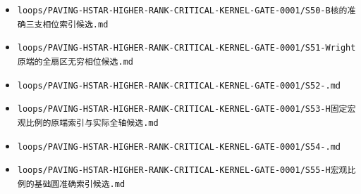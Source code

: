 \documentclass[10pt]{article}
\begin{document}
\begin{itemize}
\item \texttt{loops/\allowbreak{}PAVING-\allowbreak{}HSTAR-\allowbreak{}HIGHER-\allowbreak{}RANK-\allowbreak{}CRITICAL-\allowbreak{}KERNEL-\allowbreak{}GATE-\allowbreak{}0001/\allowbreak{}S50-B{\cjkfont 核\allowbreak{}的\allowbreak{}准\allowbreak{}确\allowbreak{}三\allowbreak{}支\allowbreak{}相\allowbreak{}位\allowbreak{}索\allowbreak{}引\allowbreak{}候\allowbreak{}选}.\allowbreak{}md}
\item \texttt{loops/\allowbreak{}PAVING-\allowbreak{}HSTAR-\allowbreak{}HIGHER-\allowbreak{}RANK-\allowbreak{}CRITICAL-\allowbreak{}KERNEL-\allowbreak{}GATE-\allowbreak{}0001/\allowbreak{}S51-\allowbreak{}Wright{\cjkfont 原\allowbreak{}端\allowbreak{}的\allowbreak{}全\allowbreak{}扇\allowbreak{}区\allowbreak{}无\allowbreak{}穷\allowbreak{}相\allowbreak{}位\allowbreak{}候\allowbreak{}选}.\allowbreak{}md}
\item \texttt{loops/\allowbreak{}PAVING-\allowbreak{}HSTAR-\allowbreak{}HIGHER-\allowbreak{}RANK-\allowbreak{}CRITICAL-\allowbreak{}KERNEL-\allowbreak{}GATE-\allowbreak{}0001/\allowbreak{}S52-.\allowbreak{}md}
\item \texttt{loops/\allowbreak{}PAVING-\allowbreak{}HSTAR-\allowbreak{}HIGHER-\allowbreak{}RANK-\allowbreak{}CRITICAL-\allowbreak{}KERNEL-\allowbreak{}GATE-\allowbreak{}0001/\allowbreak{}S53-H{\cjkfont 固\allowbreak{}定\allowbreak{}宏\allowbreak{}观\allowbreak{}比\allowbreak{}例\allowbreak{}的\allowbreak{}原\allowbreak{}端\allowbreak{}索\allowbreak{}引\allowbreak{}与\allowbreak{}实\allowbreak{}际\allowbreak{}全\allowbreak{}轴\allowbreak{}候\allowbreak{}选}.\allowbreak{}md}
\item \texttt{loops/\allowbreak{}PAVING-\allowbreak{}HSTAR-\allowbreak{}HIGHER-\allowbreak{}RANK-\allowbreak{}CRITICAL-\allowbreak{}KERNEL-\allowbreak{}GATE-\allowbreak{}0001/\allowbreak{}S54-.\allowbreak{}md}
\item \texttt{loops/\allowbreak{}PAVING-\allowbreak{}HSTAR-\allowbreak{}HIGHER-\allowbreak{}RANK-\allowbreak{}CRITICAL-\allowbreak{}KERNEL-\allowbreak{}GATE-\allowbreak{}0001/\allowbreak{}S55-H{\cjkfont 宏\allowbreak{}观\allowbreak{}比\allowbreak{}例\allowbreak{}的\allowbreak{}基\allowbreak{}础\allowbreak{}圆\allowbreak{}准\allowbreak{}确\allowbreak{}索\allowbreak{}引\allowbreak{}候\allowbreak{}选}.\allowbreak{}md}

\end{itemize}
\end{document}
